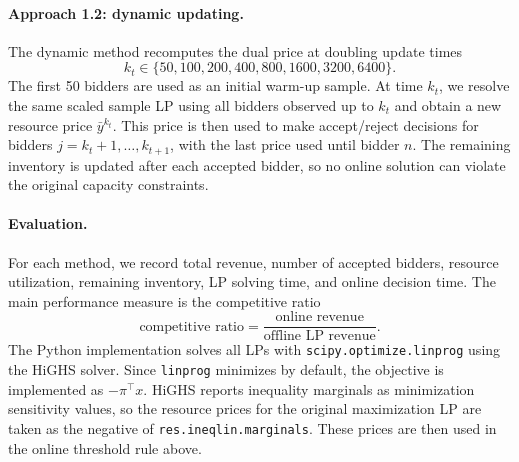 \paragraph{Approach 1.2: dynamic updating.}
The dynamic method recomputes the dual price at doubling update times
\[
    k_t\in\{50,100,200,400,800,1600,3200,6400\}.
\]
The first 50 bidders are used as an initial warm-up sample.  At time $k_t$, we
resolve the same scaled sample LP using all bidders observed up to $k_t$ and
obtain a new resource price $\bar y^{k_t}$.  This price is then used to make
accept/reject decisions for bidders $j=k_t+1,\ldots,k_{t+1}$, with the last
price used until bidder $n$.  The remaining inventory is updated after each
accepted bidder, so no online solution can violate the original capacity
constraints.

\paragraph{Evaluation.}
For each method, we record total revenue, number of accepted bidders, resource
utilization, remaining inventory, LP solving time, and online decision time.  The
main performance measure is the competitive ratio
\[
    \text{competitive ratio}
    =
    \frac{\text{online revenue}}{\text{offline LP revenue}}.
\]
The Python implementation solves all LPs with
\texttt{scipy.optimize.linprog} using the HiGHS solver.  Since
\texttt{linprog} minimizes by default, the objective is implemented as
$-\pi^\top x$.  HiGHS reports inequality marginals as minimization sensitivity
values, so the resource prices for the original maximization LP are taken as the
negative of \texttt{res.ineqlin.marginals}.  These prices are then used in the
online threshold rule above.
